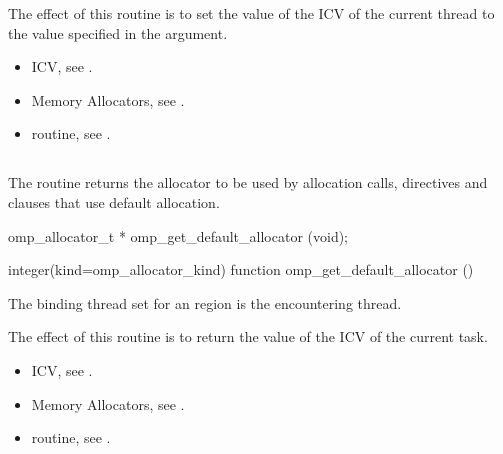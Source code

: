\effect

The effect of this routine is to set the value of the  ICV of the current thread to the value specified in the  argument. 

\crossreferences

\begin{itemize}
\item {} ICV, see .
\item Memory Allocators, see .
\item {} routine, see .
\end{itemize}

\subsection{}
\label{subsec:omp_get_default_allocator}

\summary
The  routine returns the allocator to be used by allocation calls, directives and clauses that use default allocation.

\format
\ccppspecificstart
\begin{boxedcode}
omp_allocator_t * omp_get_default_allocator (void);
\end{boxedcode}
\ccppspecificend
\fortranspecificstart
\begin{boxedcode}
integer(kind=omp_allocator_kind) 
function omp_get_default_allocator ()
\end{boxedcode}
\fortranspecificend

\binding

The binding thread set for an  region is the encountering thread.

\effect

The effect of this routine is to return the value of the  ICV of the current task.

\crossreferences
\begin{itemize}
\item {} ICV, see .
\item Memory Allocators, see .
\item {} routine, see .
\end{itemize}

